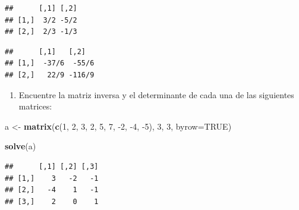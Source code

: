 \documentclass[]{article}
\newenvironment{Shaded}{\begin{snugshade}}{\end{snugshade}}
\newcommand{\DataTypeTok}[1]{\textcolor[rgb]{0.13,0.29,0.53}{#1}}
\newcommand{\DecValTok}[1]{\textcolor[rgb]{0.00,0.00,0.81}{#1}}
\newcommand{\KeywordTok}[1]{\textcolor[rgb]{0.13,0.29,0.53}{\textbf{#1}}}
\newcommand{\NormalTok}[1]{#1}
\newcommand{\OperatorTok}[1]{\textcolor[rgb]{0.81,0.36,0.00}{\textbf{#1}}}
\newcommand{\OtherTok}[1]{\textcolor[rgb]{0.56,0.35,0.01}{#1}}
\newcommand{\StringTok}[1]{\textcolor[rgb]{0.31,0.60,0.02}{#1}}
\providecommand{\tightlist}{%
  \setlength{\itemsep}{0pt}\setlength{\parskip}{0pt}}
\begin{document}
\begin{verbatim}
##      [,1] [,2]
## [1,]  3/2 -5/2
## [2,]  2/3 -1/3
\end{verbatim}

\begin{Shaded}
\end{Shaded}

\begin{verbatim}
##      [,1]   [,2]  
## [1,]  -37/6  -55/6
## [2,]   22/9 -116/9
\end{verbatim}

\begin{enumerate}
\def\labelenumi{\arabic{enumi}.}
\setcounter{enumi}{3}
\tightlist
\item
  Encuentre la matriz inversa y el determinante de cada una de las
  siguientes matrices:
\end{enumerate}

\begin{Shaded}
\begin{Highlighting}[]
\NormalTok{a <-}\StringTok{ }\KeywordTok{matrix}\NormalTok{(}\KeywordTok{c}\NormalTok{(}\DecValTok{1}\NormalTok{, }\DecValTok{2}\NormalTok{, }\DecValTok{3}\NormalTok{, }
              \DecValTok{2}\NormalTok{, }\DecValTok{5}\NormalTok{, }\DecValTok{7}\NormalTok{,}
              \DecValTok{-2}\NormalTok{, }\DecValTok{-4}\NormalTok{, }\DecValTok{-5}\NormalTok{), }
              \DecValTok{3}\NormalTok{, }\DecValTok{3}\NormalTok{, }\DataTypeTok{byrow=}\OtherTok{TRUE}\NormalTok{)}

\KeywordTok{solve}\NormalTok{(a)}
\end{Highlighting}
\end{Shaded}

\begin{verbatim}
##      [,1] [,2] [,3]
## [1,]    3   -2   -1
## [2,]   -4    1   -1
## [3,]    2    0    1
\end{verbatim}
\end{document}
